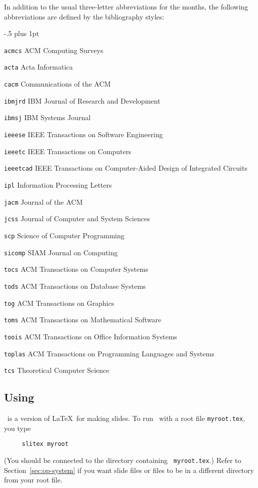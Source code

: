 In addition to the usual three-letter abbreviations for the months, the
following abbreviations are defined by the bibliography styles:
\begin{list}{}{ \itemindent-.5\leftmargin
       \itemsep=2pt plus 1pt
       \let\makelabel\descriptionlabel}\it
\item[\tt acmcs] ACM Computing Surveys
\item[\tt acta] Acta Informatica
\item[\tt cacm] Communications of the ACM
\item[\tt ibmjrd] IBM Journal of Research and Development
\item[\tt ibmsj] IBM Systems Journal
\item[\tt ieeese] IEEE Transactions on Software Engineering
\item[\tt ieeetc] IEEE Transactions on Computers
\item[\tt ieeetcad]
 IEEE Transactions on Computer-Aided Design of Integrated Circuits
\item[\tt ipl] Information Processing Letters
\item[\tt jacm] Journal of the ACM
\item[\tt jcss] Journal of Computer and System Sciences
\item[\tt scp] Science of Computer Programming
\item[\tt sicomp] SIAM Journal on Computing
\item[\tt tocs] ACM Transactions on Computer Systems
\item[\tt tods] ACM Transactions on Database Systems
\item[\tt tog] ACM Transactions on Graphics
\item[\tt toms] ACM Transactions on Mathematical Software
\item[\tt toois] ACM Transactions on Office Information Systems
\item[\tt toplas] ACM Transactions on Programming Languages and Systems
\item[\tt tcs] Theoretical Computer Science
\end{list}
 
 
\subsection{Using \SLiTeX}
 
\SLiTeX\ is a version of \LaTeX\ for making slides.
To run \SLiTeX\  with a root file \mbox{\tt myroot.tex}, you type
\begin{verbatim}
     slitex myroot
\end{verbatim}
(You should be connected to the directory containing \mbox{\tt
myroot.tex}.) Refer to Section~\ref{sec:op-system} if you want slide
files or \hbox{\verb||} files to be in a different directory from
your root file.
 
